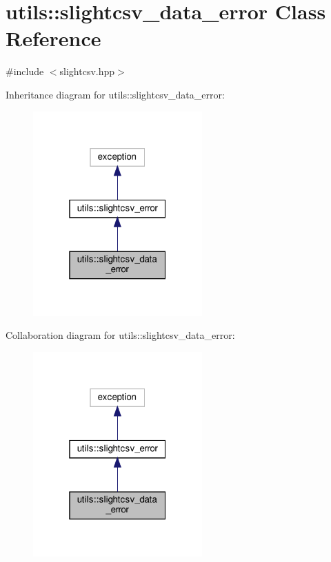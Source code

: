 \hypertarget{classutils_1_1slightcsv__data__error}{}\section{utils\+:\+:slightcsv\+\_\+data\+\_\+error Class Reference}
\label{classutils_1_1slightcsv__data__error}


{\ttfamily \#include $<$slightcsv.\+hpp$>$}



Inheritance diagram for utils\+:\+:slightcsv\+\_\+data\+\_\+error\+:\nopagebreak
\begin{figure}[H]
\begin{center}
\leavevmode
\includegraphics[width=184pt]{classutils_1_1slightcsv__data__error__inherit__graph}
\end{center}
\end{figure}


Collaboration diagram for utils\+:\+:slightcsv\+\_\+data\+\_\+error\+:\nopagebreak
\begin{figure}[H]
\begin{center}
\leavevmode
\includegraphics[width=184pt]{classutils_1_1slightcsv__data__error__coll__graph}
\end{center}
\end{figure}


